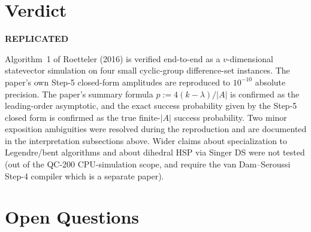 \documentclass[11pt]{article}
\begin{document}
\section{Verdict}
\begin{center}
\Large\textbf{REPLICATED}
\end{center}
Algorithm~1 of Roetteler (2016) is verified end-to-end as a
$v$-dimensional statevector simulation on four small cyclic-group
difference-set instances.  The paper's own Step-5 closed-form amplitudes
are reproduced to $10^{-10}$ absolute precision.  The paper's summary
formula $p := 4(k-\lambda)/|A|$ is confirmed as the leading-order
asymptotic, and the exact success probability given by the Step-5 closed
form is confirmed as the true finite-$|A|$ success probability.  Two
minor exposition ambiguities were resolved during the reproduction and
are documented in the interpretation subsections above.  Wider claims
about specialization to Legendre/bent algorithms and about dihedral HSP
via Singer DS were not tested (out of the QC-200 CPU-simulation scope,
and require the van Dam--Seroussi Step-4 compiler which is a separate
paper).

\section{Open Questions}
\end{document}
